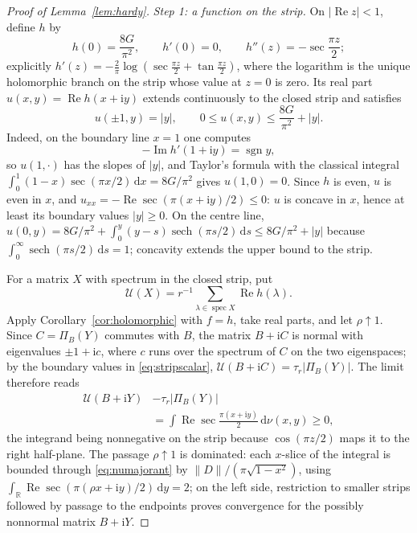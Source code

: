 \documentclass[aps,prl,reprint,superscriptaddress,longbibliography,floatfix,raggedbottom]{revtex4-2}
\newcommand{\R}{\mathbb R}
\newcommand{\ii}{\mathrm i}
\newcommand{\dd}{\,\mathrm d}
\newcommand{\norm}[1]{\lVert #1\rVert}
\newcommand{\abs}[1]{\lvert #1\rvert}
\DeclareMathOperator{\spec}{spec}
\DeclareMathOperator{\sech}{sech}
\newcommand{\tr}{\tau}
\newcommand{\Gcat}{G}
\begin{document}
\begin{proof}[Proof of Lemma~\ref{lem:hardy}]
\emph{Step 1: a function on the strip.}
On \mbox{$\abs{\operatorname{Re}z}<1$}, define $h$ by
\[
h(0)=\frac{8\Gcat}{\pi^2},\qquad h'(0)=0,\qquad
h''(z)=-\sec\frac{\pi z}2 ;
\]
explicitly $h'(z)=-\frac2\pi\log(\sec\frac{\pi z}2+\tan\frac{\pi z}2)$,
where the logarithm is the unique holomorphic branch on the strip
whose value at $z=0$ is zero.
Its real part $u(x,y)=\operatorname{Re}h(x+\ii y)$ extends continuously
to the closed strip and satisfies
\begin{equation}\label{eq:stripscalar}
u(\pm1,y)=\abs y,\qquad
0\le u(x,y)\le\frac{8\Gcat}{\pi^2}+\abs y .
\end{equation}
Indeed, on the boundary line $x=1$ one computes
\[
-\operatorname{Im}h'(1+\ii y)=\operatorname{sgn}y,
\]
so
$u(1,\cdot)$ has the slopes of $\abs y$, and Taylor's formula with the
classical integral $\int_0^1(1-x)\sec(\pi x/2)\dd x=8\Gcat/\pi^2$ gives
$u(1,0)=0$. Since $h$ is even, $u$ is even in $x$, and
$u_{xx}=-\operatorname{Re}\sec(\pi(x+\ii y)/2)\le0$: $u$ is concave in
$x$, hence at least its boundary values $\abs y\ge0$. On the centre
line, $u(0,y)=8\Gcat/\pi^2+\int_0^y(y-s)\sech(\pi s/2)\dd s
\le8\Gcat/\pi^2+\abs y$ because $\int_0^\infty\sech(\pi s/2)\dd s=1$;
concavity extends the upper bound to the strip.

For a matrix $X$ with spectrum in the closed strip, put
\[
\mathscr U(X)=r^{-1}\sum_{\lambda\in\spec X}\operatorname{Re}h(\lambda).
\]
Apply Corollary~\ref{cor:holomorphic} with $f=h$, take real parts, and
let $\rho\uparrow1$. Since $C=\Pi_B(Y)$ commutes with $B$, the matrix
$B+\ii C$ is normal with eigenvalues $\pm1+\ii c$, where $c$ runs over
the spectrum of $C$ on the two eigenspaces; by the boundary values in
\eqref{eq:stripscalar}, $\mathscr U(B+\ii C)=\tr_r\abs{\Pi_B(Y)}$. The
limit therefore reads
\begin{equation}\label{eq:stripmatrix}
\begin{split}
\mathscr U(B+\ii Y)&-\tr_r\abs{\Pi_B(Y)}\\
&=\int\operatorname{Re}\sec\frac{\pi(x+\ii y)}2\dd\nu(x,y)\ge0,
\end{split}
\end{equation}
the integrand being nonnegative on the strip because $\cos(\pi z/2)$
maps it to the right half-plane. The passage $\rho\uparrow1$ is
dominated: each $x$-slice of the integral is bounded through
\eqref{eq:numajorant} by
$\norm D/(\pi\sqrt{1-x^2})$, using
$\int_\R\operatorname{Re}\sec(\pi(\rho x+\ii y)/2)\dd y=2$; on the left
side, restriction to smaller strips followed by passage to the
endpoints proves convergence for the possibly nonnormal matrix
$B+\ii Y$.


\end{proof}
\end{document}
